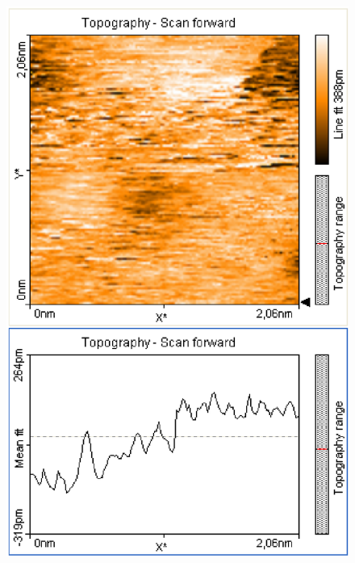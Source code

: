 \documentclass[12pt]{article}
\begin{document}
\begin{figure}[H]
\begin{minipage}{0.4\linewidth}
\includegraphics[width=0.9\linewidth]{../plot/data/mos2/mos25.eps}
\end{minipage}
\end{figure}
\end{document}
